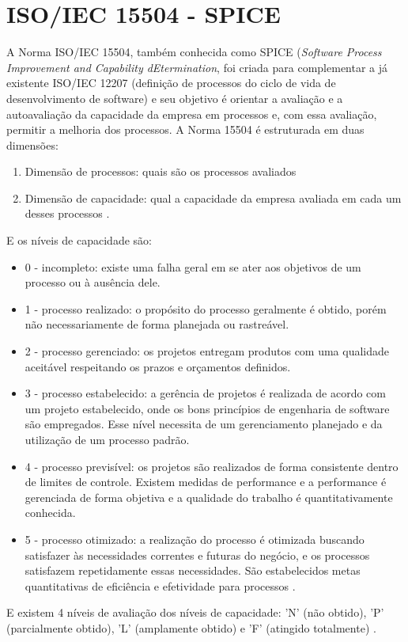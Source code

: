\documentclass[12pt]{article}
\begin{document}
\section{ISO/IEC 15504 - SPICE}
A Norma ISO/IEC 15504, também conhecida como SPICE (\textit{Software Process Improvement and Capability dEtermination}, foi criada para complementar a já existente ISO/IEC 12207 (definição de processos do ciclo de vida de desenvolvimento de software) e seu objetivo é orientar a avaliação e a autoavaliação da capacidade da empresa em processos e, com essa avaliação, permitir a melhoria dos processos. A Norma 15504 é estruturada em duas dimensões:
\begin{enumerate}
    \item Dimensão de processos: quais são os processos avaliados
    \item Dimensão de capacidade: qual a capacidade da empresa avaliada em cada um desses processos \cite{sommerville2007engenharia}.
\end{enumerate}
E os níveis de capacidade são:
\begin{itemize}
    \item 0 - incompleto: existe uma falha geral em se ater aos objetivos de um processo ou à ausência dele.
    \item 1 - processo realizado: o propósito do processo geralmente é obtido, porém não necessariamente de forma planejada ou rastreável.
    \item 2 - processo gerenciado: os projetos entregam produtos com uma qualidade aceitável respeitando os prazos e orçamentos definidos. 
    \item 3 - processo estabelecido: a gerência de projetos é realizada de acordo com um projeto estabelecido, onde os bons princípios de engenharia de software são empregados. Esse nível necessita de um gerenciamento planejado e da utilização de um processo padrão.
    \item 4 - processo previsível: os projetos são realizados de forma consistente dentro de limites de controle. Existem medidas de performance e a performance é gerenciada de forma objetiva e a qualidade do trabalho é quantitativamente conhecida.
    \item 5 - processo otimizado: a realização do processo é otimizada buscando satisfazer às necessidades correntes e futuras do negócio, e os processos satisfazem repetidamente essas necessidades. São estabelecidos metas quantitativas de eficiência e efetividade para processos \cite{sommerville2007engenharia}.
\end{itemize}
E existem 4 níveis de avaliação dos níveis de capacidade: 'N' (não obtido), 'P' (parcialmente obtido), 'L' (amplamente obtido) e 'F' (atingido totalmente) \cite{sommerville2007engenharia}.
\end{document}
